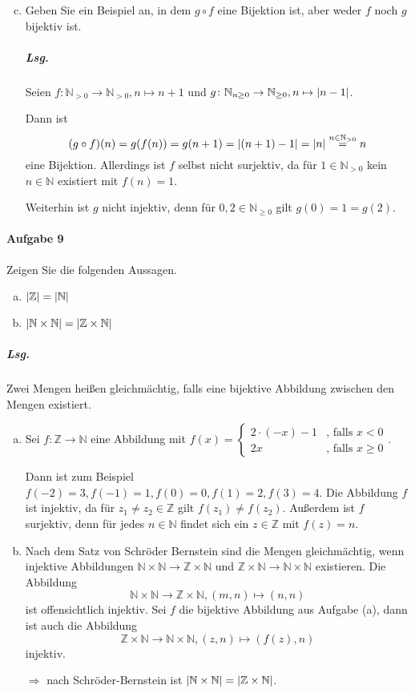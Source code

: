 \documentclass{scrreprt}
\begin{document}
\begin{enumerate}[(a)]
\setcounter{enumi}{2}
\item Geben Sie ein Beispiel an, in dem $g \circ f$ eine Bijektion ist, aber
  weder $f$ noch $g$ bijektiv ist.

  \subparagraph{Lsg.} Seien $f \colon \mathbb{N}_{> 0} \to \mathbb{N}_{> 0},
  n \mapsto n + 1$ und $g \colon \mathbb{N}_{n \geq 0} \to \mathbb{N}_{\geq 0},
  n \mapsto \abs{n - 1}$.

  Dann ist
  \[
    (g \circ f)(n) = g(f(n)) = g(n + 1) = \abs{(n + 1) - 1} = \abs{n}
    \overset{n \in \mathbb{N}_{> 0}}= n
  \]
  eine Bijektion.
  Allerdings ist $f$ selbst nicht surjektiv, da für $1 \in \mathbb{N}_{> 0}$ kein
  $n \in \mathbb{N}$ existiert mit $f(n) = 1$.

  Weiterhin ist $g$ nicht injektiv, denn für $0, 2 \in \mathbb{N}_{\geq 0}$
  gilt $g(0) = 1 = g(2)$.
\end{enumerate}

\newpage
\paragraph{Aufgabe 9} Zeigen Sie die folgenden Aussagen.
\begin{enumerate}[(a)]
\item $\abs{\mathbb{Z}} = \abs{\mathbb{N}}$
\item $\abs{\mathbb{N} \times \mathbb{N}} = \abs{\mathbb{Z} \times \mathbb{N}}$
\end{enumerate}

\subparagraph{Lsg.} Zwei Mengen heißen gleichmächtig, falls eine bijektive
Abbildung zwischen den Mengen existiert.

\begin{enumerate}[(a)]
\item Sei $f \colon \mathbb{Z} \to \mathbb{N}$ eine Abbildung mit
  $f(x) = \begin{cases}
    2 \cdot (-x) - 1 & \text{, falls } x < 0 \\
    2x & \text{, falls } x \geq 0
  \end{cases}$.

  Dann ist zum Beispiel $f(-2) = 3, f(-1) = 1, f(0) = 0, f(1) = 2, f(3) = 4$.
  Die Abbildung $f$ ist injektiv, da für $z_1 \ne z_2 \in \mathbb{Z}$ gilt
  $f(z_1) \ne f(z_2)$.
  Außerdem ist $f$ surjektiv, denn für jedes $n \in \mathbb{N}$ findet sich ein
  $z \in \mathbb{Z}$ mit $f(z) = n$.

\item Nach dem Satz von Schröder Bernstein sind die Mengen gleichmächtig,
  wenn injektive Abbildungen
  $\mathbb{N} \times \mathbb{N} \to \mathbb{Z} \times \mathbb{N}$ und
  $\mathbb{Z} \times \mathbb{N} \to \mathbb{N} \times \mathbb{N}$ existieren.
  Die Abbildung
  \[
    \mathbb{N} \times \mathbb{N} \to \mathbb{Z} \times \mathbb{N},
    (m, n) \mapsto (n, n)
  \]
  ist offensichtlich injektiv.
  Sei $f$ die bijektive Abbildung aus Aufgabe (a), dann ist auch die Abbildung
  \[
    \mathbb{Z} \times \mathbb{N} \to \mathbb{N} \times \mathbb{N},
    (z, n) \mapsto (f(z), n)
  \]
  injektiv.

  $\Rightarrow$ nach Schröder-Bernstein ist
  $\abs{\mathbb{N} \times \mathbb{N}} = \abs{\mathbb{Z} \times \mathbb{N}}$.
\end{enumerate}
\end{document}
